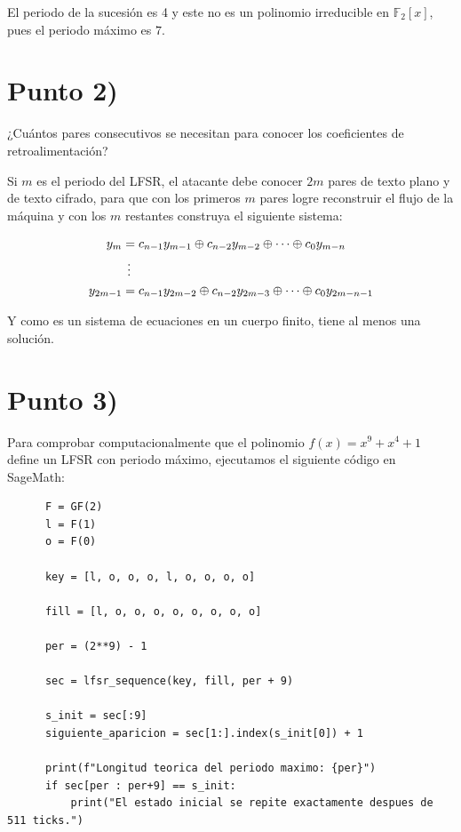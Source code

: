 \documentclass{article}
\begin{document}
    El periodo de la sucesión es 4 y este no es un polinomio irreducible en $\mathbb{F}_2[x]$,
    pues el periodo máximo es $7$.

  \section*{Punto 2)}
    ¿Cuántos pares consecutivos se necesitan para conocer los coeficientes de retroalimentación?

    Si $m$ es el periodo del LFSR, el atacante debe conocer $2m$ pares de texto plano
    y de texto cifrado, para que con los primeros $m$ pares logre reconstruir el flujo 
    de la máquina y con los $m$ restantes construya el siguiente sistema:

    \begin{equation*}
      \begin{aligned}
        y_m &= c_{n-1} y_{m-1} \oplus c_{n-2} y_{m-2} \oplus \cdots \oplus c_0 y_{m-n} \\
        &\hspace{0.15cm}\vdots \\
        y_{2m-1} &= c_{n-1} y_{2m-2} \oplus c_{n-2} y_{2m-3} \oplus \cdots \oplus c_0 y_{2m-n-1}
      \end{aligned}
    \end{equation*}

    Y como es un sistema de ecuaciones en un cuerpo finito, tiene al menos una solución.

  \section*{Punto 3)}
    Para comprobar computacionalmente que el polinomio $f(x) = x^9 + x^4 + 1$ define un LFSR con periodo máximo, ejecutamos el siguiente código en SageMath:

    \begin{lstlisting}
      F = GF(2)
      l = F(1)
      o = F(0)

      key = [l, o, o, o, l, o, o, o, o]

      fill = [l, o, o, o, o, o, o, o, o]

      per = (2**9) - 1

      sec = lfsr_sequence(key, fill, per + 9)

      s_init = sec[:9]
      siguiente_aparicion = sec[1:].index(s_init[0]) + 1 

      print(f"Longitud teorica del periodo maximo: {per}")
      if sec[per : per+9] == s_init:
          print("El estado inicial se repite exactamente despues de 511 ticks.")
    \end{lstlisting}
\end{document}
